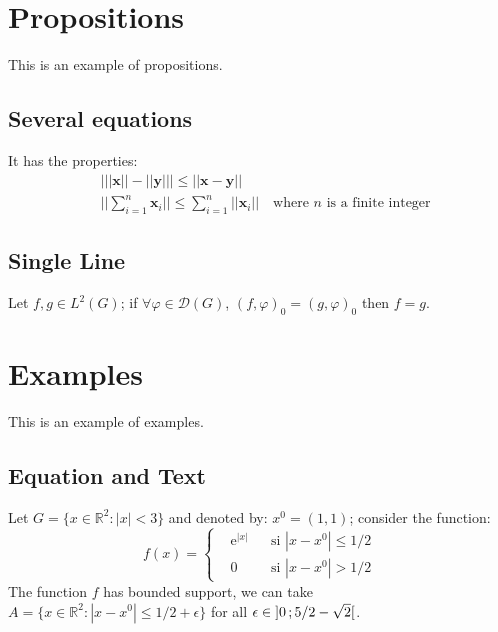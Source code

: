 \documentclass[12pt,fleqn,a4paper]{book} %
\begin{document}
    \section{Propositions}
    
    This is an example of propositions.
    
    \subsection{Several equations}
    
    \begin{proposition}
    It has the properties:
    \begin{align}
    & \big| ||\mathbf{x}|| - ||\mathbf{y}|| \big|\leq || \mathbf{x}- \mathbf{y}||\\
    &  ||\sum_{i=1}^n\mathbf{x}_i||\leq \sum_{i=1}^n||\mathbf{x}_i||\quad\text{where $n$ is a finite integer}
    \end{align}
    \end{proposition}
    
    \subsection{Single Line}
    
    \begin{proposition} 
    Let $f,g\in L^2(G)$; if $\forall \varphi\in\mathcal{D}(G)$, $(f,\varphi)_0=(g,\varphi)_0$ then $f = g$. 
    \end{proposition}
    
    
    \section{Examples}
    
    This is an example of examples.
    
    \subsection{Equation and Text}
    
    \begin{example}
    Let $G=\{x\in\mathbb{R}^2:|x|<3\}$ and denoted by: $x^0=(1,1)$; consider the function:
    \begin{equation}
    f(x)=\left\{\begin{aligned} & \mathrm{e}^{|x|} & & \text{si $|x-x^0|\leq 1/2$}\\
    & 0 & & \text{si $|x-x^0|> 1/2$}\end{aligned}\right.
    \end{equation}
    The function $f$ has bounded support, we can take $A=\{x\in\mathbb{R}^2:|x-x^0|\leq 1/2+\epsilon\}$ for all $\epsilon\in\mathopen{]}0\,;5/2-\sqrt{2}\mathclose{[}$.
    \end{example}
    
\end{document}
